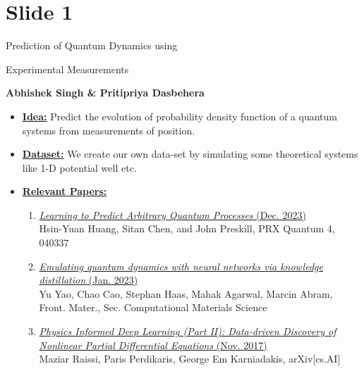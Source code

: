 \documentclass[10pt, xcolor=x11names,compress]{beamer}
\begin{document}
\section{Slide 1}
\begin{frame}[label=Background]{\centerline {Prediction of Quantum Dynamics using} \centerline{Experimental Measurements}}
\begin{center}
    \textbf{Abhishek Singh \& Pritipriya Dasbehera}
\end{center}
\begin{itemize}
    \item \underline{\textbf{Idea:}} Predict the evolution of probability density function of a quantum systems from measurements of position.
    \item \underline{\textbf{Dataset:}} We create our own data-set by simulating some theoretical systems like 1-D potential well etc.
    \item \underline{\textbf{Relevant Papers:}}
              \begin{enumerate}
              \scriptsize
                  \item \href{https://doi.org/10.1103/PRXQuantum.4.040337}{\textit{Learning to Predict Arbitrary Quantum Processes} (Dec. 2023)}\\Hsin-Yuan Huang, Sitan Chen, and John Preskill, PRX Quantum 4, 040337
                  \item \href{https://doi.org/10.3389/fmats.2022.1060744}{\textit{Emulating quantum dynamics with neural networks via knowledge distillation} (Jan. 2023)}\\
                  Yu Yao, Chao Cao, Stephan Haas, Mahak Agarwal, Marcin Abram, Front. Mater.,                  Sec. Computational Materials Science
                  \item \href{https://arxiv.org/abs/1711.10566}{\textit{Physics Informed Deep Learning (Part II): Data-driven Discovery of Nonlinear Partial Differential Equations} (Nov. 2017)}\\
                  Maziar Raissi, Paris Perdikaris, George Em Karniadakis, arXiv[cs.AI]
              \end{enumerate}

    
\end{itemize} 
\end{frame}
\end{document}
